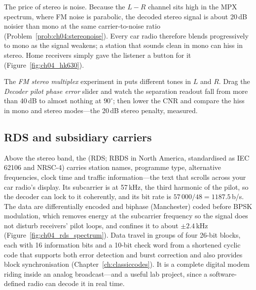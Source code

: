The price of stereo is noise. Because the $L-R$ channel sits high in the MPX spectrum, where FM noise is
parabolic, the decoded stereo signal is about 20\,dB noisier than mono at the same carrier-to-noise ratio
(Problem~\ref{prob:ch04:stereonoise}). Every car radio therefore blends
progressively to mono as the signal weakens; a station that sounds clean in mono can hiss in stereo. Home
receivers simply gave the listener a button for it (Figure~\ref{fig:ch04_hk630}).


\begin{tryit}
The \emph{FM stereo multiplex} experiment in  puts different tones in $L$ and
$R$. Drag the \emph{Decoder pilot phase error} slider and watch the separation readout fall from more than 40\,dB to almost
nothing at $90^\circ$; then lower the CNR and compare the hiss in mono and stereo modes---the 20\,dB stereo
penalty, measured.
\end{tryit}

\subsection{RDS and subsidiary carriers}

Above the stereo band, the  (RDS; RBDS in North America, standardised as IEC 62106
and NRSC-4) carries station names, programme type, alternative frequencies, clock time and traffic
information---the text that scrolls across your car radio's display. Its subcarrier is at 57\,kHz, the third
harmonic of the pilot, so the decoder can lock to it coherently, and its bit rate is $57\,000/48=1187.5$\,b/s.
The data are differentially encoded and biphase (Manchester) coded before BPSK modulation, which removes
energy at the subcarrier frequency so the signal does not disturb receivers' pilot loops, and confines it to
about $\pm2.4$\,kHz (Figure~\ref{fig:ch04_rds_spectrum}). Data travel in groups of four 26-bit blocks, each with 16 information bits and a 10-bit
check word from a shortened cyclic code that supports both error detection and burst correction and also
provides block synchronisation (Chapter~\ref{ch:classiccodes}). It is a complete digital modem riding inside
an analog broadcast---and a useful lab project, since a software-defined radio can decode it in real time.

